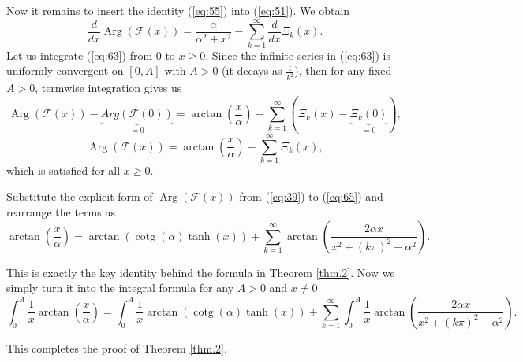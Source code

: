 \documentclass[preprint,12pt,nopreprintline]{elsarticle}
\begin{document}
Now it remains to insert the identity (\ref{eq:55}) into (\ref{eq:51}). We obtain
\begin{equation}\label{eq:63}
\frac{d}{dx}\operatorname{Arg}\left(\mathscr{F}\left(x\right)\right)=\frac{\alpha}{\alpha^2+x^2}-\sum_{k=1}^{\infty}\frac{d}{dx}\Xi_k\left(x\right).
\end{equation}
Let us integrate (\ref{eq:63}) from $0$ to $x\geq 0$. Since the infinite series in (\ref{eq:63}) is uniformly convergent on $[0,A]$ with $A>0$ (it decays as $\frac{1}{k^2}$), then for any fixed $A>0$, termwise integration gives us
\begin{equation}\label{eq:64}
\operatorname{Arg}\left(\mathscr{F}\left(x\right)\right)-\underbrace{Arg\left(\mathscr{F}\left(0\right)\right)}_{=0}=\operatorname{arctan}\left(\frac{x}{\alpha}\right)-\sum_{k=1}^{\infty}\left(\Xi_k\left(x\right)-\underbrace{\Xi_k\left(0\right)}_{=0}\right),
\end{equation}
\begin{equation}\label{eq:65}
\operatorname{Arg}\left(\mathscr{F}\left(x\right)\right)=\operatorname{arctan}\left(\frac{x}{\alpha}\right)-\sum_{k=1}^{\infty}\Xi_k\left(x\right),
\end{equation}
which is satisfied for all $x\geq 0$.

\newpage
Substitute the explicit form of $\operatorname{Arg}\left(\mathscr{F}\left(x\right)\right)$ from (\ref{eq:39}) to (\ref{eq:65}) and rearrange the terms as
\begin{equation}\label{eq:66}
\operatorname{arctan}\left(\frac{x}{\alpha}\right)=\operatorname{arctan}\left(\operatorname{cotg}\left(\alpha\right)\operatorname{tanh}\left(x\right)\right)+\sum_{k=1}^{\infty}\operatorname{arctan}\left(\frac{2\alpha x}{x^2+\left(k\pi\right)^2-\alpha^2}\right).
\end{equation}

This is exactly the key identity behind the formula in Theorem \ref{thm.2}. Now we simply turn it into the integral formula for any $A>0$ and $x\neq 0$
\begin{equation}\label{eq:67}
\int_0^A\frac{1}{x}\operatorname{arctan}\left(\frac{x}{\alpha}\right)=\int_0^A\frac{1}{x}\operatorname{arctan}\left(\operatorname{cotg}\left(\alpha\right)\operatorname{tanh}\left(x\right)\right)+\sum_{k=1}^{\infty}\int_0^A\frac{1}{x}\operatorname{arctan}\left(\frac{2\alpha x}{x^2+\left(k\pi\right)^2-\alpha^2}\right).
\end{equation}

This completes the proof of Theorem \ref{thm.2}.
\end{document}
